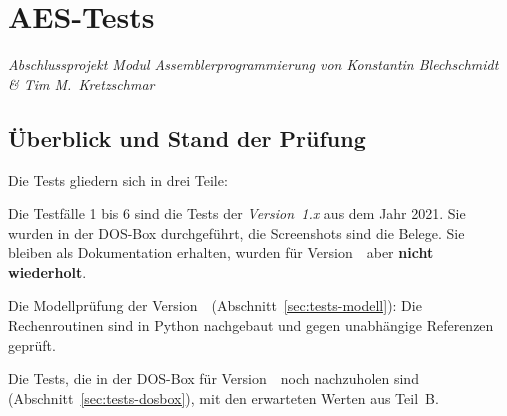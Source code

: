 
\newcommand{\hexdez}[2]{$#1_{\text{hex}}$ ($#2_{\text{dez}}$)}
\newcommand{\hexs}[1]{$#1_{\text{hex}}$}
\newcommand{\sbrow}[4]{#1 & \hexdez{#2}{#3} & \hexs{#4} & \iconok \\ \hline}
\newcommand{\srrow}[6]{#1 & \hexdez{#2}{#3} & \hexdez{#4}{#5} & \cellcolor{blk#6} #6 \\ \hline}
\newcommand{\sarow}[5]{#1 & \hexdez{#2}{#3} & \hexs{#4} & \hexs{#5} \\ \hline}

\section{AES-Tests}\label{sec:tests}
\textit{Abschlussprojekt Modul \glqq Assemblerprogrammierung\grqq{} von Konstantin Blechschmidt \& Tim M.\ Kretzschmar}

\subsection{Überblick und Stand der Prüfung}\label{sec:tests-stand}
Die Tests gliedern sich in drei Teile:
\begin{description}[leftmargin=!,labelwidth=2.2cm,noitemsep]
    \item[Teil A] Die Testfälle 1 bis 6 sind die Tests der \emph{Version~1.x} aus dem Jahr 2021. Sie wurden in der DOS-Box durchgeführt, die Screenshots sind die Belege. Sie bleiben als Dokumentation erhalten, wurden für Version~\versionProjekt\ aber \textbf{nicht wiederholt}.
    \item[Teil B] Die Modellprüfung der Version~\versionProjekt\ (Abschnitt~\ref{sec:tests-modell}): Die Rechenroutinen sind in Python nachgebaut und gegen unabhängige Referenzen geprüft.
    \item[Teil C] Die Tests, die in der DOS-Box für Version~\versionProjekt\ noch nachzuholen sind (Abschnitt~\ref{sec:tests-dosbox}), mit den erwarteten Werten aus Teil~B.
\end{description}

